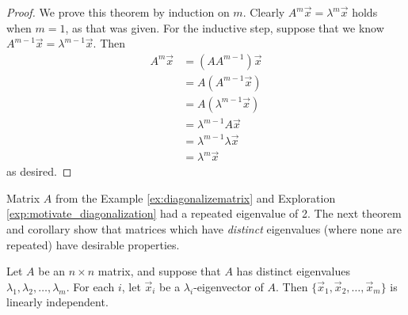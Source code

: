 \documentclass{ximera}
\begin{document}
\begin{proof}
We prove this theorem by induction on $m$.  Clearly $A^m \vec{x} = \lambda^m \vec{x}$ holds when $m=1$, as that was given.  For the inductive step, suppose that we know $A^{m-1} \vec{x} = \lambda^{m-1} \vec{x}$.  Then
\begin{align*}
    A^m \vec{x} &= (A A^{m-1}) \vec{x} \\
          &= A (A^{m-1} \vec{x}) \\
          &= A (\lambda^{m-1} \vec{x}) \\
          &= \lambda^{m-1} A\vec{x} \\
          &= \lambda^{m-1} \lambda \vec{x} \\
          &= \lambda^m \vec{x}
\end{align*}
as desired.
\end{proof}

Matrix $A$ from the Example \ref{ex:diagonalizematrix} and Exploration \ref{exp:motivate_diagonalization} had a repeated eigenvalue of 2.  The next theorem and corollary show that matrices which have \emph{distinct} eigenvalues (where none are repeated) have desirable properties.

\begin{theorem}\label{th:linindepeigenvectors}
Let $A$ be an $n\times n$ matrix, and suppose that $A$
has distinct eigenvalues $\lambda_1, \lambda_2, \ldots, \lambda_m$.
For each $i$, let $\vec{x}_i$ be a $\lambda_i$-eigenvector of $A$.
Then $\{ \vec{x}_1, \vec{x}_2, \ldots, \vec{x}_m\}$ is
linearly independent.
\end{theorem}
\end{document}
